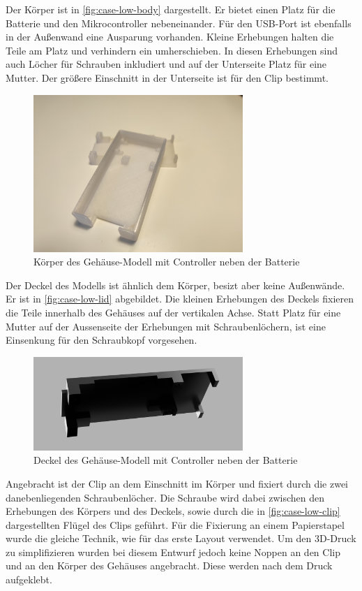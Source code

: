 Der Körper ist in \autoref{fig:case-low-body} dargestellt.
Er bietet einen Platz für die Batterie und den Mikrocontroller nebeneinander.
Für den \gls{USB}-Port ist ebenfalls in der Außenwand eine Ausparung vorhanden.
Kleine Erhebungen halten die Teile am Platz und verhindern ein umherschieben.
In diesen Erhebungen sind auch Löcher für Schrauben inkludiert und auf der Unterseite Platz für eine Mutter.
Der größere Einschnitt in der Unterseite ist für den Clip bestimmt.

\begin{figure}[htbp]
	\includegraphics[width=300px]{images/case/low_body.jpg}
	\centering
	\caption{Körper des Gehäuse-Modell mit Controller neben der Batterie}
	\label{fig:case-low-body}
\end{figure}

Der Deckel des Modells ist ähnlich dem Körper, besizt aber keine Außenwände.
Er ist in \autoref{fig:case-low-lid} abgebildet.
Die kleinen Erhebungen des Deckels fixieren die Teile innerhalb des Gehäuses auf der vertikalen Achse.
Statt Platz für eine Mutter auf der Aussenseite der Erhebungen mit Schraubenlöchern, ist eine Einsenkung für den Schraubkopf vorgesehen.

\begin{figure}[htbp]
	\includegraphics[width=300px]{images/case/low_lid.png}
	\centering
	\caption{Deckel des Gehäuse-Modell mit Controller neben der Batterie}
	\label{fig:case-low-lid}
\end{figure}

Angebracht ist der Clip an dem Einschnitt im Körper und fixiert durch die zwei danebenliegenden Schraubenlöcher.
Die Schraube wird dabei zwischen den Erhebungen des Körpers und des Deckels, sowie durch die in
\autoref{fig:case-low-clip} dargestellten Flügel des Clips geführt.
Für die Fixierung an einem Papierstapel wurde die gleiche Technik, wie für das erste Layout verwendet.
Um den 3D-Druck zu simplifizieren wurden bei diesem Entwurf jedoch keine Noppen an den Clip und an
den Körper des Gehäuses angebracht. Diese werden nach dem Druck aufgeklebt.

